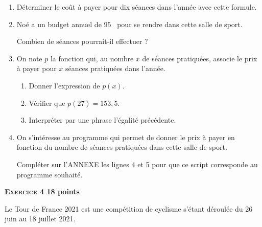 \documentclass[11pt]{article}
\newcommand{\euro}{\eurologo{}}
\begin{document}
\medskip

\begin{enumerate}
\item Déterminer le coût à payer pour dix séances dans l'année avec cette formule.
\item Noé a un budget annuel de $95$~\euro{} pour se rendre dans cette salle de sport.

Combien de séances pourrait-il effectuer ?
\item On note $p$ la fonction qui, au nombre $x$ de séances pratiquées, associe le prix à payer pour $x$ séances pratiquées dans l'année.
	\begin{enumerate}
		\item Donner l'expression de $p(x)$.
		\item Vérifier que $p(27) = 153,5$.
		\item Interpréter par une phrase l'égalité précédente.
\end{enumerate}
\item On s'intéresse au programme qui permet de donner le prix à payer en fonction du nombre de séances pratiquées dans cette salle de sport.

\begin{center}
\begin{scratch}
\end{scratch}
\end{center}

Compléter sur l'ANNEXE  les lignes 4 et 5 pour que ce script corresponde au programme souhaité.
\end{enumerate}

\bigskip

\textbf{{\large \textsc{Exercice 4}} \hfill 18 points}

\medskip

Le Tour de France 2021 est une compétition de cyclisme s'étant déroulée du 26 juin au 18 juillet 2021.
\end{document}
